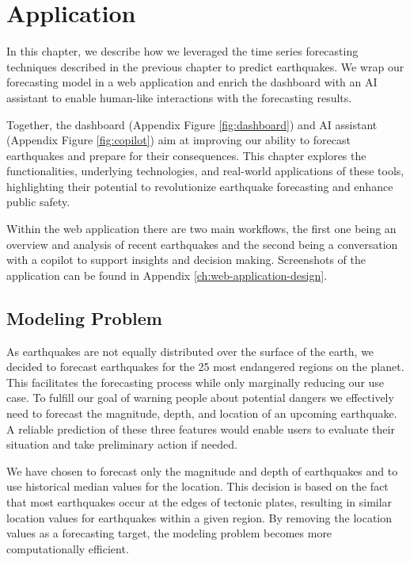 \chapter{Application}
\label{ch:application}
In this chapter, we describe how we leveraged the time series forecasting techniques
described in the previous chapter to predict earthquakes. We wrap our forecasting
model in a web application and enrich the dashboard with an AI assistant
to enable human-like interactions with the forecasting results.

Together, the dashboard (Appendix Figure \ref{fig:dashboard}) and
AI assistant (Appendix Figure \ref{fig:copilot}) aim at improving our ability to forecast
earthquakes and prepare for their consequences. This chapter explores the functionalities,
underlying technologies, and real-world applications of these tools, highlighting their
potential to revolutionize earthquake forecasting and enhance public safety.

Within the web application there are two main workflows, the first one being an overview and
analysis of recent earthquakes and the second being a conversation with a copilot to
support insights and decision making. Screenshots of the application can be found in
Appendix \ref{ch:web-application-design}.

\section{Modeling Problem}

As earthquakes are not equally distributed over the surface of the earth,
we decided to forecast earthquakes for the 25 most endangered regions on
the planet. This facilitates the forecasting process while only marginally
reducing our use case. To fulfill our goal of warning people about potential
dangers we effectively need to forecast the magnitude, depth, and location of
an upcoming earthquake. A reliable prediction of these three features would
enable users to evaluate their situation and take preliminary action if needed.

We have chosen to forecast only the magnitude and depth of earthquakes and
to use historical median values for the location. This decision is based
on the fact that most earthquakes occur at the edges of tectonic plates,
resulting in similar location values for earthquakes within a given region.
By removing the location values as a forecasting target, the modeling problem
becomes more computationally efficient.

